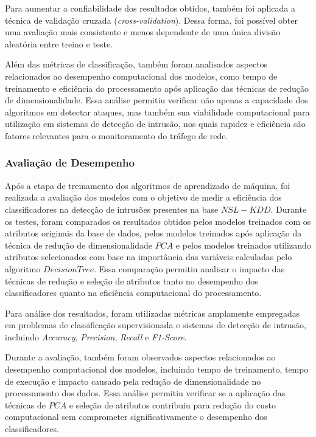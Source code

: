 \documentclass[a4paper,10pt, twocolumn]{article}
\begin{document}
Para aumentar a confiabilidade dos resultados obtidos, também foi aplicada a 
técnica de validação cruzada (\textit{cross-validation}). Dessa forma, foi 
possível obter uma avaliação mais consistente e menos dependente de uma única 
divisão aleatória entre treino e teste.

Além das métricas de classificação, também foram analisados aspectos relacionados 
ao desempenho computacional dos modelos, como tempo de treinamento e eficiência 
do processamento após aplicação das técnicas de redução de dimensionalidade. 
Essa análise permitiu verificar não apenas a capacidade dos algoritmos em 
detectar ataques, mas também sua viabilidade computacional para utilização em 
sistemas de detecção de intrusão, nos quais rapidez e eficiência são fatores 
relevantes para o monitoramento do tráfego de rede.

\subsubsection{Avaliação de Desempenho}
Após a etapa de treinamento dos algoritmos de aprendizado de máquina, foi 
realizada a avaliação dos modelos com o objetivo de medir a eficiência dos 
classificadores na detecção de intrusões presentes na base $NSL-KDD$. Durante os 
testes, foram comparados os resultados obtidos pelos modelos treinados com os 
atributos originais da base de dados, pelos modelos treinados após aplicação da 
técnica de redução de dimensionalidade $PCA$ e pelos modelos treinados utilizando 
atributos selecionados com base na importância das variáveis calculadas pelo 
algoritmo \textit{$Decision Tree$}. Essa comparação permitiu analisar o impacto das técnicas 
de redução e seleção de atributos tanto no desempenho dos classificadores 
quanto na eficiência computacional do processamento. 

Para análise dos resultados, foram utilizadas métricas amplamente empregadas em 
problemas de classificação supervisionada e sistemas de detecção de intrusão, 
incluindo \textit{Accuracy}, \textit{Precision}, \textit{Recall} e \textit{F1-Score}. 

Durante a avaliação, também foram observados aspectos relacionados ao desempenho 
computacional dos modelos, incluindo tempo de treinamento, tempo de execução e 
impacto causado pela redução de dimensionalidade no processamento dos dados. 
Essa análise permitiu verificar se a aplicação das técnicas de $PCA$ e seleção de 
atributos contribuiu para redução do custo computacional sem comprometer 
significativamente o desempenho dos classificadores. 
\end{document}
